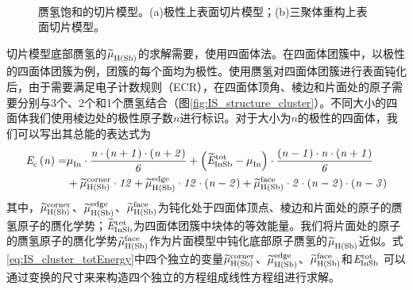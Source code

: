\begin{figure}[htb]
    \\[-0.5ex]
    \caption{赝氢饱和的切片模型。(a)极性上表面切片模型；(b)三聚体重构上表面切片模型。}
    \label{fig:IS_structure_slab_pseH}
\end{figure}


切片模型底部赝氢的$\it \widetilde{\mu}_{\rm H\left(Sb\right)}^{\rm } \it$的求解需要，使用四面体法。在四面体团簇中，以极性的四面体团簇为例，团簇的每个面均为极性。使用赝氢对四面体团簇进行表面钝化后，由于需要满足电子计数规则（ECR），在四面体顶角、棱边和片面处的原子需要分别与3个、2个和1个赝氢结合（图\ref{fig:IS_structure_cluster}）。不同大小的四面体我们使用棱边处的极性原子数$n$进行标识。对于大小为$n$的极性的四面体，我们可以写出其总能的表达式为\chinesecolon
\begin{equation}
    \label{eq:IS_cluster_totEnergy}
    \begin{split}
        \it E_{\rm c}^{\rm } \it\left(n\right)=&\it \mu_{\rm In}^{\rm } \it \cdot \frac{n\cdot \left(n+1\right) \cdot \left(n+2\right)}{6} +\left(\it \widetilde{E}_{\rm InSb}^{\rm tot} \it-\it \mu_{\rm In}^{\rm } \it\right)\cdot \frac{\left(n-1\right)\cdot n \cdot \left(n+1\right)}{6}\\
        &+\it \widetilde{\mu}_{\rm H\left(Sb\right)}^{\rm corner} \it\cdot 12 + \it \widetilde{\mu}_{\rm H\left(Sb\right)}^{\rm edge} \it\cdot 12 \cdot \left(n-2\right) + \it \widetilde{\mu}_{\rm H\left(Sb\right)}^{\rm face} \it\cdot 2 \cdot (n-2) \cdot (n-3)
    \end{split}
\end{equation}
其中，$\it \widetilde{\mu}_{\rm H\left(Sb\right)}^{\rm corner} \it$、$\it \widetilde{\mu}_{\rm H\left(Sb\right)}^{\rm edge} \it$、$\it \widetilde{\mu}_{\rm H\left(Sb\right)}^{\rm face} \it$为钝化处于四面体顶点、棱边和片面处的原子的赝氢原子的赝化学势；$\it \widetilde{E}_{\rm InSb}^{\rm tot} \it$为四面体团簇中块体的等效能量。我们将片面处的原子的赝氢原子的赝化学势$\it \widetilde{\mu}_{\rm H\left(Sb\right)}^{\rm face} \it$作为片面模型中钝化底部原子赝氢的$\it \widetilde{\mu}_{\rm H\left(Sb\right)}^{\rm } \it$近似。式\ref{eq:IS_cluster_totEnergy}中四个独立的变量$\it \widetilde{\mu}_{\rm H\left(Sb\right)}^{\rm corner} \it$、$\it \widetilde{\mu}_{\rm H\left(Sb\right)}^{\rm edge} \it$、$\it \widetilde{\mu}_{\rm H\left(Sb\right)}^{\rm face} \it$和$\it E_{\rm InSb}^{\rm tot} \it$
可以通过变换的尺寸来来构造四个独立的方程组成线性方程组进行求解。

